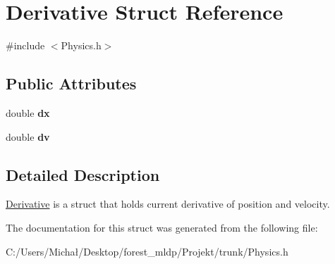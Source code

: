 \hypertarget{struct_derivative}{}\section{Derivative Struct Reference}
\label{struct_derivative}


{\ttfamily \#include $<$Physics.\+h$>$}

\subsection*{Public Attributes}
\begin{DoxyCompactItemize}
\item 
double {\bfseries dx}\hypertarget{struct_derivative_af2c8c808951f130ad174773225232632}{}\label{struct_derivative_af2c8c808951f130ad174773225232632}

\item 
double {\bfseries dv}\hypertarget{struct_derivative_a9089fc29a05b81dd3ac6cd1e8d792ba9}{}\label{struct_derivative_a9089fc29a05b81dd3ac6cd1e8d792ba9}

\end{DoxyCompactItemize}


\subsection{Detailed Description}
\hyperlink{struct_derivative}{Derivative} is a struct that holds current derivative of position and velocity. 

The documentation for this struct was generated from the following file\+:\begin{DoxyCompactItemize}
\item 
C\+:/\+Users/\+Michał/\+Desktop/forest\+\_\+mldp/\+Projekt/trunk/Physics.\+h\end{DoxyCompactItemize}
